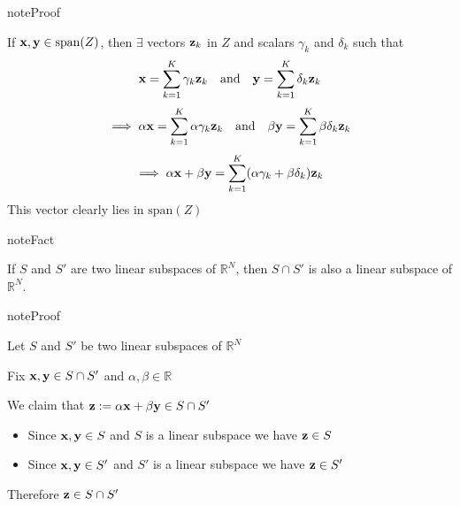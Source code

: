 \documentclass[letterpaper,10pt,english]{jupyterBook}
\begin{document}
\begin{sphinxadmonition}{note}{Proof}

\sphinxAtStartPar
If \({\bf x}, {\bf y} \in \mathrm{span}(Z)\), then \(\exists\) vectors \({\bf z}_k\) in \(Z\)
and scalars \(\gamma_k\) and \(\delta_k\) such that
\begin{equation*}
\begin{split}
{\bf x} = \sum_{k=1}^K \gamma_k {\bf z}_k
\quad \text{and} \quad
{\bf y} = \sum_{k=1}^K \delta_k {\bf z}_k
\end{split}
\end{equation*}\begin{equation*}
\begin{split}
\implies
\alpha {\bf x} = \sum_{k=1}^K \alpha \gamma_k {\bf z}_k
\quad \text{and} \quad
\beta {\bf y} = \sum_{k=1}^K \beta \delta_k {\bf z}_k 
\end{split}
\end{equation*}\begin{equation*}
\begin{split}
\implies
\alpha {\bf x} + \beta {\bf y} 
= \sum_{k=1}^K (\alpha \gamma_k + \beta \delta_k) {\bf z}_k 
\end{split}
\end{equation*}
\sphinxAtStartPar
This vector clearly lies in \(\mathrm{span}(Z)\)
\end{sphinxadmonition}

\begin{sphinxadmonition}{note}{Fact}

\sphinxAtStartPar
If \(S\) and \(S'\) are two linear subspaces of \(\mathbb{R}^N\), then \(S \cap S'\) is also a linear subspace of \(\mathbb{R}^N\).
\end{sphinxadmonition}

\begin{sphinxadmonition}{note}{Proof}

\sphinxAtStartPar
Let \(S\) and \(S'\) be two linear subspaces of \(\mathbb{R}^N\)

\sphinxAtStartPar
Fix \({\bf x}, {\bf y} \in S \cap S'\) and \(\alpha, \beta \in \mathbb{R}\)

\sphinxAtStartPar
We claim that \({\bf z} := \alpha {\bf x} + \beta {\bf y} \in S \cap S'\)
\begin{itemize}
\item {} 
\sphinxAtStartPar
Since \({\bf x}, {\bf y} \in S\) and \(S\) is a linear subspace we have \({\bf z} \in S\)

\item {} 
\sphinxAtStartPar
Since \({\bf x}, {\bf y} \in S'\) and \(S'\) is a linear subspace we have \({\bf z} \in S'\)

\end{itemize}

\sphinxAtStartPar
Therefore \({\bf z} \in S \cap S'\)
\end{sphinxadmonition}
\end{document}
